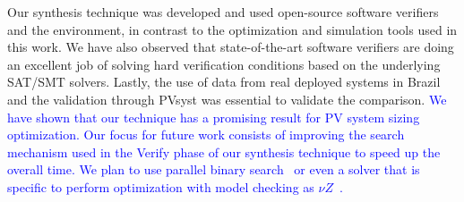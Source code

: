 \documentclass[runningheads]{llncs}
\begin{document}
Our synthesis technique was developed and used open-source software verifiers and the environment, in contrast to the optimization and simulation tools used in this work. We have also observed that state-of-the-art software verifiers are doing an excellent job of solving hard verification conditions based on the underlying SAT/SMT solvers. Lastly, the use of data from real deployed systems in Brazil and the validation through PVsyst was essential to validate the comparison. \textcolor{blue}{We have shown that our technique has a promising result for PV system sizing optimization. Our focus for future work consists of improving the search mechanism used in the {\sc Verify} phase of our synthesis technique to speed up the overall time. We plan to use parallel binary search~\cite{TrindadeDJISC17} or even a solver that is specific to perform optimization with model checking as $\nu Z$~\cite{BjornerPF15}.}

%
%


%
\end{document}
